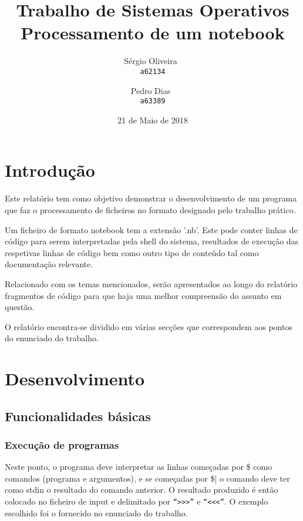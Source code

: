 \documentclass[11pt,a4paper]{report}
\begin{document}
\title{Trabalho de Sistemas Operativos\\Processamento de um notebook}
\author{
   Sérgio Oliveira~\\
   \texttt{a62134}
   \and
   Pedro Dias~\\
   \texttt{a63389}
}
\date{21 de Maio de 2018}
\maketitle
\raggedbottom
\pagebreak
\pagebreak


\tableofcontents
\pagebreak
\chapter{Introdução}

Este relatório tem como objetivo demonstrar o desenvolvimento de um programa que faz o processamento de ficheiros no formato designado pelo trabalho prático.

Um ficheiro de formato notebook tem a extensão '.nb'. Este pode conter linhas de código para serem interpretadas pela shell do sistema, resultados de execução das respetivas linhas de código bem como outro tipo de conteúdo tal como documentação relevante.

Relacionado com os temas mencionados, serão apresentados ao longo do relatório fragmentos de código para que haja uma melhor compreensão do assunto em questão.

O relatório encontra-se dividido em várias secções que correspondem aos pontos do enunciado do trabalho.
\raggedbottom
\pagebreak


\chapter{Desenvolvimento}
\section{Funcionalidades básicas}
\subsection{Execução de programas}
Neste ponto, o programa deve interpretar as linhas começadas por \$ como comandos (programa e argumentos), e se começadas por \$| o comando deve ter como stdin o resultado do comando anterior. O resultado produzido é então colocado no ficheiro de input e delimitado por \verb|“>>>”| e \verb|“<<<”|.
O exemplo escolhido foi o fornecido no enunciado do trabalho.
\end{document}
